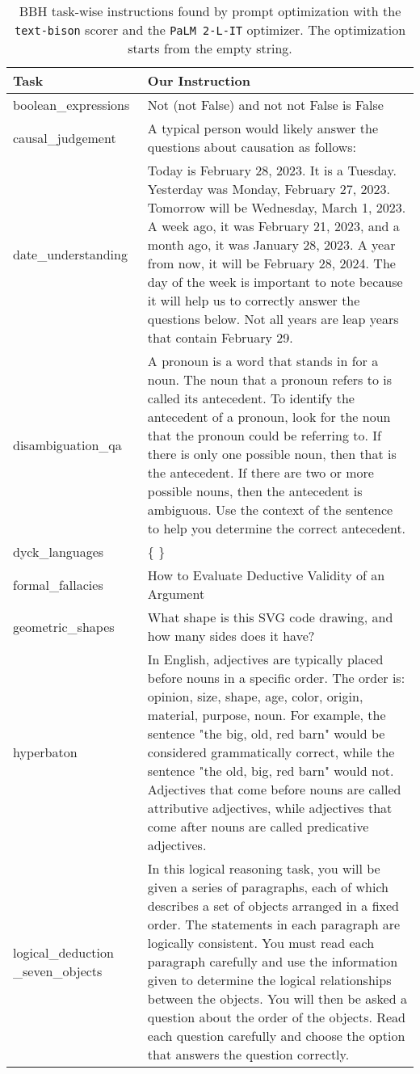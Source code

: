 \newpage
\begin{table}[H]
\scriptsize
\caption{BBH task-wise instructions found by prompt optimization with the \texttt{text-bison} scorer and the \texttt{PaLM 2-L-IT} optimizer.
The optimization starts from the empty string.
}
\begin{center}
\begin{tabular}{P{2.3cm}P{11.6cm}}
\toprule
Task& Our Instruction \\
\midrule
boolean\_expressions & Not (not False) and not not False is False \\ [2ex]
causal\_judgement & A typical person would likely answer the questions about causation as follows: \\ [2ex]
date\_understanding & Today is February 28, 2023. It is a Tuesday. Yesterday was Monday, February 27, 2023. Tomorrow will be Wednesday, March 1, 2023. A week ago, it was February 21, 2023, and a month ago, it was January 28, 2023. A year from now, it will be February 28, 2024. The day of the week is important to note because it will help us to correctly answer the questions below. Not all years are leap years that contain February 29. \\ [2ex]
disambiguation\_qa & A pronoun is a word that stands in for a noun. The noun that a pronoun refers to is called its antecedent. To identify the antecedent of a pronoun, look for the noun that the pronoun could be referring to. If there is only one possible noun, then that is the antecedent. If there are two or more possible nouns, then the antecedent is ambiguous. Use the context of the sentence to help you determine the correct antecedent. \\ [2ex]
dyck\_languages & \{ \} \\ [2ex]
formal\_fallacies & How to Evaluate Deductive Validity of an Argument \\ [2ex]
geometric\_shapes & What shape is this SVG code drawing, and how many sides does it have? \\ [2ex]
hyperbaton & In English, adjectives are typically placed before nouns in a specific order. The order is: opinion, size, shape, age, color, origin, material, purpose, noun. For example, the sentence "the big, old, red barn" would be considered grammatically correct, while the sentence "the old, big, red barn" would not. Adjectives that come before nouns are called attributive adjectives, while adjectives that come after nouns are called predicative adjectives. \\ [2ex]
logical\_deduction \_seven\_objects & In this logical reasoning task, you will be given a series of paragraphs, each of which describes a set of objects arranged in a fixed order. The statements in each paragraph are logically consistent. You must read each paragraph carefully and use the information given to determine the logical relationships between the objects. You will then be asked a question about the order of the objects. Read each question carefully and choose the option that answers the question correctly. \\ [2ex]

\end{tabular}
\end{center}
\end{table}
